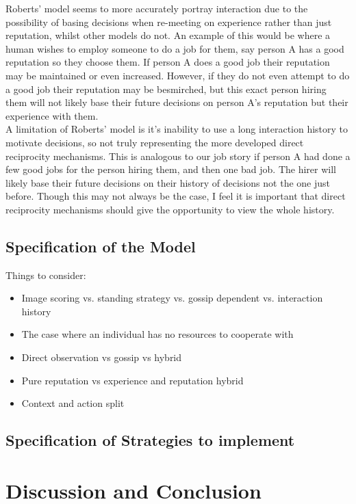 \documentclass[twoside,twocolumn]{article}
\begin{document}
Roberts' model seems to more accurately portray interaction due to the possibility of basing decisions when re-meeting on experience rather than just reputation, whilst other models do not. An example of this would be where a human wishes to employ someone to do a job for them, say person A has a good reputation so they choose them. If person A does a good job their reputation may be maintained or even increased. However, if they do not even attempt to do a good job their reputation may be besmirched, but this exact person hiring them will not likely base their future decisions on person A's reputation but their experience with them. \\
A limitation of Roberts' model is it's inability to use a long interaction history to motivate decisions, so not truly representing the more developed direct reciprocity mechanisms. This is analogous to our job story if person A had done a few good jobs for the person hiring them, and then one bad job. The hirer will likely base their future decisions on their history of decisions not the one just before. Though this may not always be the case, I feel it is important that direct reciprocity mechanisms should give the opportunity to view the whole history.\\

\subsection{Specification of the Model}
Things to consider:
\begin{itemize}
	\item Image scoring vs. standing strategy vs. gossip dependent vs. interaction history
	\item The case where an individual has no resources to cooperate with
	\item Direct observation vs gossip vs hybrid
	\item Pure reputation vs experience and reputation hybrid
	\item Context and action split
\end{itemize}

\subsection{Specification of Strategies to implement}



\section{Discussion and Conclusion}



{}


\end{document}
